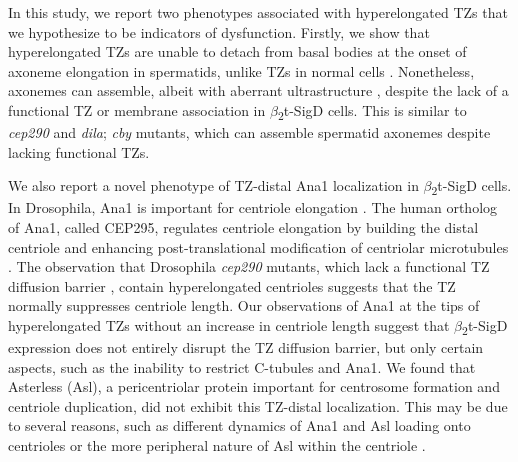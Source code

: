 \documentclass[12pt, twoside, letterpaper]{article}
\newcommand{\sigd}{$\beta$\textsubscript{2}t-SigD}
\begin{document}
\begin{doublespacing}
\begin{linenumbers}
    In this study, we report two phenotypes associated with
    hyperelongated TZs that we hypothesize to be indicators of
    dysfunction.
    Firstly, we show that hyperelongated TZs are unable to
    detach from basal bodies at the onset of axoneme elongation
    in spermatids, unlike TZs in normal cells \citep{basiri2014migrating, fabian2012drosophila}.
    Nonetheless, axonemes can assemble, albeit with aberrant ultrastructure \citep{wei2008depletion},
    despite the lack of a functional
    TZ or membrane association in \sigd{} cells.
    This is similar to \textit{cep290} \citep{basiri2014migrating}
    and \textit{dila}; \textit{cby} \citep{vieillard2016transition}
    mutants,
    which can assemble spermatid axonemes despite lacking
    functional TZs.
    
    We also report a novel phenotype of TZ-distal Ana1 localization
    in \sigd{} cells.
    In Drosophila, Ana1 is important for centriole elongation
    \citep{saurya2016drosophila}.
    The human ortholog of Ana1, called CEP295, regulates
    centriole elongation by building the distal centriole and
    enhancing post-translational modification of centriolar
    microtubules \citep{chang2016cep295}.
    The observation that Drosophila \textit{cep290} mutants,
    which lack a functional TZ diffusion barrier
    \citep{basiri2014migrating},
    contain hyperelongated centrioles suggests that the
    TZ normally suppresses centriole length.
    Our observations of Ana1 at the tips of hyperelongated TZs
    without an increase in centriole length suggest that \sigd{} expression
    does not entirely disrupt the TZ diffusion barrier, but only certain aspects,
    such as the inability to restrict C-tubules and Ana1.
    We found that
    Asterless (Asl), a pericentriolar protein
    \citep{blachon2008drosophila}
    important for centrosome formation and centriole duplication, did not
    exhibit this TZ-distal localization.
    This may be due to several reasons, such as different dynamics of Ana1 and Asl
    loading onto centrioles \citep{fu2016conserved, saurya2016drosophila} or the
    more peripheral nature of Asl within the centriole \citep{blachon2008drosophila}.
    

\end{linenumbers}
\end{doublespacing}
\end{document}
